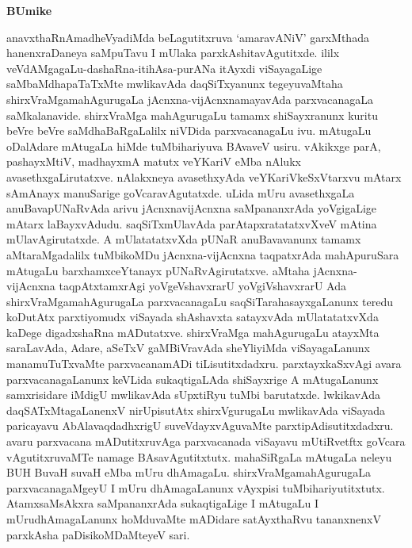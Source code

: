 \newpage

\begin{center}
{\Large\bf BUmike}
\end{center}
 
 anavxthaRnAmadheVyadiMda beLagutitxruva `amaravANiV' garxMthada hanenxraDaneya saMpuTavu I mUlaka parxkAshitavAgutitxde. ililx veVdAMgagaLu-dashaRna-itihAsa-purANa itAyxdi viSayagaLige saMbaMdhapaTaTxMte mwlikavAda daqSiTxyanunx tegeyuvaMtaha shirxVraMgamahAgurugaLa jAcnxna-vijAcnxnamayavAda parxvacanagaLa saMkalanavide. shirxVraMga mahAgurugaLu tamamx shiSayxranunx kuritu beVre beVre saMdhaBaRgaLalilx niVDida parxvacanagaLu ivu. mAtugaLu oDalAdare mAtugaLa hiMde tuMbihariyuva BAvaveV usiru. vAkikxge parA, pashayxMtiV, madhayxmA matutx veYKariV eMba nAlukx avasethxgaLirutatxve. nAlakxneya avasethxyAda veYKariVkeSxVtarxvu mAtarx sAmAnayx manuSarige goVcaravAgutatxde. uLida mUru avasethxgaLa anuBavapUNaRvAda arivu jAcnxnavijAcnxna saMpananxrAda yoVgigaLige mAtarx laBayxvAdudu. saqSiTxmUlavAda parAtapxratatatxvXveV mAtina mUlavAgirutatxde. A mUlatatatxvXda pUNaR anuBavavanunx tamamx aMtaraMgadalilx tuMbikoMDu jAcnxna-vijAcnxna taqpatxrAda mahApuruSara mAtugaLu barxhamxceYtanayx pUNaRvAgirutatxve. aMtaha jAcnxna-vijAcnxna taqpAtxtamxrAgi yoVgeVshavxrarU yoVgiVshavxrarU Ada shirxVraMgamahAgurugaLa parxvacanagaLu saqSiTarahasayxgaLanunx teredu koDutAtx parxtiyomudx viSayada shAshavxta satayxvAda mUlatatatxvXda kaDege digadxshaRna mADutatxve. shirxVraMga mahAgurugaLu atayxMta saraLavAda, Adare, aSeTxV gaMBiVravAda sheYliyiMda viSayagaLanunx manamuTuTxvaMte parxvacanamADi tiLisutitxdadxru. parxtayxkaSxvAgi avara parxvacanagaLanunx keVLida sukaqtigaLAda shiSayxrige A mAtugaLanunx samxrisidare iMdigU mwlikavAda sUpxtiRyu tuMbi barutatxde. lwkikavAda daqSATxMtagaLanenxV nirUpisutAtx shirxVgurugaLu mwlikavAda viSayada paricayavu AbAlavaqdadhxrigU suveVdayxvAguvaMte parxtipAdisutitxdadxru. avaru parxvacana mADutitxruvAga parxvacanada viSayavu mUtiRvetftx goVcara vAgutitxruvaMTe namage BAsavAgutitxtutx. mahaSiRgaLa mAtugaLa neleyu BUH  BuvaH suvaH eMba mUru dhAmagaLu. shirxVraMgamahAgurugaLa parxvacanagaMgeyU I mUru dhAmagaLanunx vAyxpisi tuMbihariyutitxtutx. AtamxsaMsAkxra saMpananxrAda sukaqtigaLige I mAtugaLu I mUrudhAmagaLanunx hoMduvaMte mADidare satAyxthaRvu tananxnenxV parxkAsha paDisikoMDaMteyeV sari.

